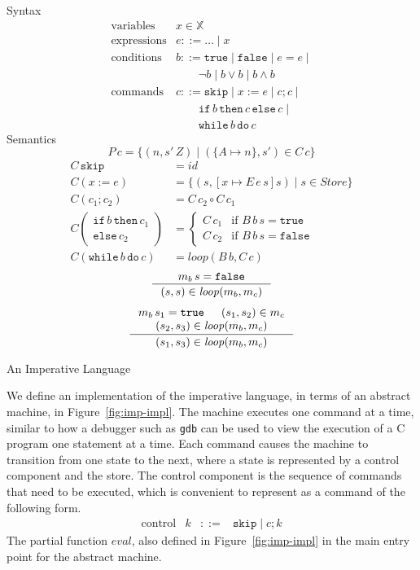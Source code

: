 \documentclass{tufte-handout}
\newcommand{\ASSIGN}[2]{#1 \mathrel{:=} #2}
\newcommand{\SEQ}[2]{#1 \mathrel{;} #2}
\newcommand{\SKIP}[0]{\mathtt{skip}}
\newcommand{\IF}[3]{\mathtt{if}\,#1\,\mathtt{then}\,#2\,\mathtt{else}\,#3}
\newcommand{\WHILE}[2]{\mathtt{while}\,#1\,\mathtt{do}\,#2}
\newcommand{\TRUE}[0]{\mathtt{true}}
\newcommand{\FALSE}[0]{\mathtt{false}}
\begin{document}
\begin{marginfigure}
\noindent Syntax
\[
\begin{array}{ll}
  \text{variables} & x \in \mathbb{X}  \\
 \text{expressions} & e ::= \ldots \mid x \\
 \text{conditions} & b  ::= \TRUE \mid \FALSE \mid e = e \mid \\
  &   \qquad \neg b \mid b \lor b \mid b \land b \\
 \text{commands}& c ::= \SKIP \mid \ASSIGN{x}{e} \mid \SEQ{c}{c} \mid\\
  &      \qquad \IF{b}{c}{c} \mid \\
  &      \qquad \WHILE{b}{c} 
\end{array}
\]
Semantics 
\[
P\,c = \{ (n,s'\,Z) \mid (\{A{\mapsto} n\},s') \in C\,c \}
\]
\begin{align*}
C\,\SKIP &= \mathit{id} \\ %
C(\ASSIGN{x}{e}) &= \{ (s,[x\mapsto E\,e\,s]s) \mid s {\in} \mathit{Store} \}\\
C(\SEQ{c_1}{c_2}) &=  C\,c_2 \circ C\,c_1 \\
C\left(\!\!\begin{array}{l}
  \mathtt{if}\,b\,\mathtt{then}\,c_1\\
  \mathtt{else}\,c_2
  \end{array}\!\!\right)
  &= 
 \begin{cases}
  C\,c_1 & \text{if } B\,b\,s = \TRUE \\
  C\,c_2 & \text{if } B\,b\,s = \FALSE
 \end{cases} \\
C(\WHILE{b}{c}) &= \mathit{loop}(B\,b, C\,c)
\end{align*}
\begin{gather*}
  \inference{m_b\,s = \FALSE}
            {(s,s) \in \mathit{loop}(m_b, m_c)}
\\[1ex]
  \inference{m_b\,s_1 = \TRUE & 
             (s_1,s_2) \in m_c \\
             (s_2, s_3) \in \mathit{loop}(m_b, m_c)}
            {(s_1, s_3) \in \mathit{loop}(m_b, m_c)}
\end{gather*}
\caption{An Imperative Language}
\label{fig:imperative}
\end{marginfigure}


We define an implementation of the imperative language, in terms of an
abstract machine, in Figure~\ref{fig:imp-impl}. The machine executes
one command at a time, similar to how a debugger such as \texttt{gdb}
can be used to view the execution of a C program one statement at a
time. Each command causes the machine to transition from one state to
the next, where a state is represented by a control component and the
store. The control component is the sequence of commands that need to
be executed, which is convenient to represent as a command of the
following form.
\[
\begin{array}{lrcl}
  \text{control} & k & ::= & \SKIP \mid \SEQ{c}{k}
\end{array}
\]
The partial function $\mathit{eval}$, also defined in
Figure~\ref{fig:imp-impl} in the main entry point for the abstract
machine.
\end{document}
